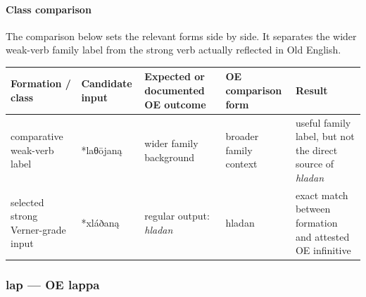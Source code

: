 \documentclass[
  british,
  a4paper,
]{article}
\newcounter{none} %
\begin{document}
\paragraph{Class comparison}\label{class-comparison-2}

The comparison below sets the relevant forms side by side. It separates
the wider weak-verb family label from the strong verb actually reflected
in Old English.

{\def\LTcaptype{none} %
\begin{longtable}[]{@{}
  >{\raggedright\arraybackslash}p{}
  >{\raggedright\arraybackslash}p{}
  >{\raggedright\arraybackslash}p{}
  >{\raggedright\arraybackslash}p{}
  >{\raggedright\arraybackslash}p{}@{}}
\toprule\noalign{}
\begin{minipage}[b]{\linewidth}\raggedright
Formation / class
\end{minipage} & \begin{minipage}[b]{\linewidth}\raggedright
Candidate input
\end{minipage} & \begin{minipage}[b]{\linewidth}\raggedright
Expected or documented OE outcome
\end{minipage} & \begin{minipage}[b]{\linewidth}\raggedright
OE comparison form
\end{minipage} & \begin{minipage}[b]{\linewidth}\raggedright
Result
\end{minipage} \\
\midrule\noalign{}
\endhead
\bottomrule\noalign{}
\endlastfoot
comparative weak-verb label & *laθōjaną & wider family background &
broader family context & useful family label, but not the direct source
of \emph{hladan} \\
selected strong Verner-grade input & *xláðaną & regular output:
\emph{hladan} & hladan & exact match between formation and attested OE
infinitive \\
\end{longtable}
}

\subsubsection{lap --- OE lappa}\label{lap-oe-lappa}
\end{document}
